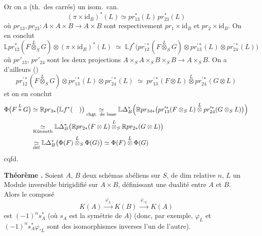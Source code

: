 \documentclass[11pt,a4paper]{article}
\begin{document}
Or on a (th.\ des carrés) un isom.\ can.
\[
  (\pi \times \mathrm{id}_B)^{*}(L) \simeq pr_{13}^{*}(L)\, pr_{23}^{*}(L)
\]
où $pr_{13}, pr_{23} \colon A \times A \times B \to A \times B$ sont
respectivement $pr_1 \times \mathrm{id}_B$ et $pr_2 \times \mathrm{id}_B$. On
en conclut
\[
  \mathbb{L}pr_{12}^{*}(F \overset{L}{\otimes}_S G) \otimes (\pi \times \mathrm{id}_B)^{*}(L)
  \;\simeq\;
  \mathbb{L}f^{*}\bigl(pr^{\prime *}_{12}(F \overset{L}{\otimes}_S G) \otimes pr^{\prime *}_{13}(L) \otimes pr^{\prime *}_{24}(L)\bigr)
\]
où $pr'_{13}$, $pr'_{24}$ sont les deux projections
$A \times_S A \times_S B \times_S B \to A \times_S B$. On a d'ailleurs
 ()
\[
  pr^{\prime *}_{12}(F \overset{L}{\otimes}_S G) \otimes pr^{\prime *}_{13}(L) \otimes pr^{\prime *}_{24}(L)
  \;\simeq\;
  pr^{\prime *}_{13}(F \otimes L) \overset{L}{\otimes} pr^{\prime *}_{24}(G \otimes L)
\]
et on en conclut
\begin{align*}
\Phi\bigl(F \overset{L}{*} G\bigr)
  &\simeq \mathbb{R}pr_{3*}\bigl(\mathbb{L}f^{*}(\quad)\bigr)
  \underset{\text{chgt. de base}}{\simeq}
    \mathbb{L}\Delta_B^{*}\Bigl(\mathbb{R}pr_{34*}\bigl(pr^{\prime *}_{13}(F \otimes_S L) \overset{L}{\otimes} pr^{\prime *}_{24}(G \otimes_S L)\bigr)\Bigr) \\
  &\underset{\text{Künneth}}{\simeq}
    \mathbb{L}\Delta_B^{*}\bigl(\mathbb{R}pr_{2*}(F \otimes L) \overset{L}{\otimes}_S \mathbb{R}pr_{2*}(G \otimes L)\bigr) \\
  &\underset{\text{déf}}{\simeq}
    \mathbb{L}\Delta_B^{*}\bigl(\Phi(F) \overset{L}{\otimes}_S \Phi(G)\bigr)
  \simeq \Phi(F) \overset{L}{\otimes} \Phi(G)
\end{align*}
cqfd.


\textbf{Théorème .} Soient $A$, $B$ deux schémas
abéliens sur $S$, de dim relative $n$, $L$ un Module inversible birigidifié
sur $A \times B$, définissant une dualité entre $A$ et $B$.
 Alors le composé 
\[
  K(A) \xrightarrow{\;\varphi_L\;} K(B) \xrightarrow{\;\varphi_{{}^{s}L}\;} K(A)
\]
est $(-1)^n s_A^{*}$ (où $s_A$ est la symétrie de $A$) (donc, par exemple,
$\varphi_L$ et $(-1)^n s_A^{*} \varphi_{{}^{s}L}$ sont des isomorphismes
inverses l'un de l'autre).

\end{document}
